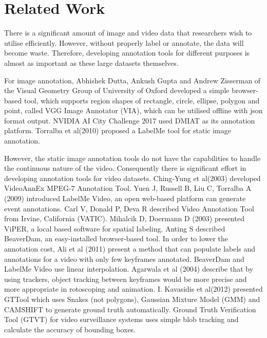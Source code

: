 \documentclass[conference]{IEEEtran}
\begin{document}
\section{Related Work}\label{sec.related}

There is a significant amount of image and video data that researchers wish to utilise efficiently. However, without properly label or annotate, the data will become waste. Therefore, developing annotation tools for different purposes is almost as important as these large datasets themselves.

For image annotation, Abhishek Dutta, Ankush Gupta and Andrew Zisserman of the Visual Geometry Group of University of Oxford developed a simple browser-based tool, which supports region shapes of rectangle, circle, ellipse, polygon and point, called VGG Image Annotator (VIA)\cite{abh2017via}, which can be utilised offline with json format output. NVIDIA AI City Challenge 2017 used DMIAT as its annotation platform. Torralba et al(2010)\cite{Russell2008labelme} proposed a LabelMe tool for static image annotation.  

However, the static image annotation tools do not have the capabilities to handle the continuous nature of the video. Consequently there is significant effort in developing annotation tools for video datasets. Ching-Yung et al(2003)\cite{lin2003videoann} developed VideoAnnEx MPEG-7 Annotation Tool. Yuen J, Russell B, Liu C, Torralba A (2009)\cite{yuen2009labelmevideo} introduced LabelMe Video, an open web-based platform can generate event annotations. Carl V, Donald P, Deva R\cite{carl2012vatic} described Video Annotation Tool from Irvine, California (VATIC). Mihalcik D, Doermann D (2003) presented ViPER\cite{mihalcik2003viper}, a local based software for spatial labeling. Anting S\cite{shen2016beaverdam} described BeaverDam, an easy-installed browser-based tool. In order to lower the annotation cost, Ali et al (2011)\cite{ali2011flowboost} present a method that can populate labels and annotations for a video with only few keyframes annotated. BeaverDam and LabelMe Video use linear interpolation. Agarwala et al (2004)\cite{agarwala2004tracker} describe that by using trackers, object tracking between keyframes would be more precise and more appropriate in rotoscoping and animation. I. Kavasidis et al(2012)\cite{I2012GTTool} presented GTTool which uses Snakes\cite{kass1988snakes} (not polygons), Gaussian Mixture Model (GMM)\cite{stauffer1999gmm} and CAMSHIFT\cite{bradski1998camshift} to generate ground truth automatically. Ground Truth Verification Tool (GTVT)\cite{ambardekar2009gtvt} for video surveillance systems uses simple blob tracking\cite{gupte2002sblobtrack} and calculate the accuracy of bounding boxes.
\end{document}
